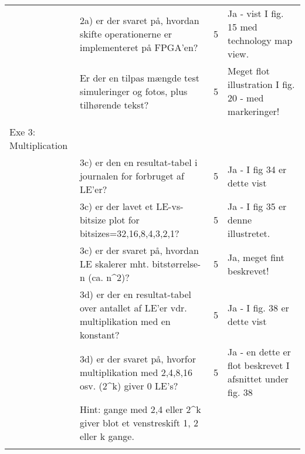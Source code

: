 \begin{table}[h]
\begin{tabularx}{\textwidth}{p{3.5cm}Xp{5mm}X}
                                              & 2a) er der svaret på, hvordan skifte operationerne er implementeret på FPGA’en?                     & 5 & Ja - vist I fig. 15 med technology map view.              \\
                                              & Er der en tilpas mængde test simuleringer og fotos, plus tilhørende tekst?                          & 5 & Meget flot illustration I fig. 20 - med markeringer!      \\
                                              &                                                                                                     &   &                                                           \\\midrule
        Exe 3: Multiplication                 &                                                                                                     &   &                                                           \\
                                              & 3c) er den en resultat-tabel i journalen for forbruget af LE’er?                                    & 5 & Ja - I fig 34 er dette vist                               \\
                                              & 3c) er der lavet et LE-vs-bitsize plot for bitsizes=32,16,8,4,3,2,1?                                & 5 & Ja - I fig 35 er denne illustretet.                       \\
                                              & 3c) er der svaret på, hvordan LE skalerer mht. bitstørrelse-n (ca. n\textasciicircum{}2)?           & 5 & Ja, meget fint beskrevet!                                 \\
                                              & 3d) er der en resultat-tabel over antallet af LE’er vdr. multiplikation med en konstant?            & 5 & Ja - I fig. 38 er dette vist                              \\
                                              & 3d) er der svaret på, hvorfor multiplikation med 2,4,8,16 osv. (2\textasciicircum{}k) giver 0 LE’s? & 5 & Ja - en dette er flot beskrevet I afsnittet under fig. 38 \\
                                              & Hint: gange med 2,4 eller 2\textasciicircum{}k giver blot et venstreskift 1, 2 eller k gange.       &   &                                                           \\
                                              &                                                                                                     &   &                                                           \\\midrule
    \end{tabularx}
\end{table}
